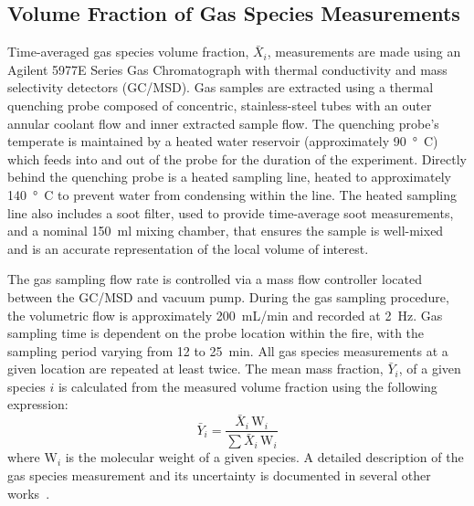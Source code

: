 \documentclass[12pt]{ussci}
\begin{document}
\subsection{Volume Fraction of Gas Species Measurements}
Time-averaged gas species volume fraction, $\bar{X}_{i}$, measurements are made using an Agilent 5977E Series Gas Chromatograph with thermal conductivity and mass selectivity detectors (GC/MSD). Gas samples are extracted using a thermal quenching probe composed of concentric, stainless-steel tubes with an outer annular coolant flow and inner extracted sample flow. The quenching probe's temperate is maintained by a heated water reservoir (approximately \SI{90}{\degree C}) which feeds into and out of the probe for the duration of the experiment. Directly behind the quenching probe is a heated sampling line, heated to approximately \SI{140}{\degree C} to prevent water from condensing within the line. The heated sampling line also includes a soot filter, used to provide time-average soot measurements, and a nominal 150~ml mixing chamber, that ensures the sample is well-mixed and is an accurate representation of the local volume of interest.

The gas sampling flow rate is controlled via a mass flow controller located between the GC/MSD and vacuum pump. During the gas sampling procedure, the volumetric flow is approximately 200~mL/min and recorded at 2~Hz. Gas sampling time is dependent on the probe location within the fire, with the sampling period varying from 12 to 25~min. All gas species measurements at a given location are repeated at least twice. The mean mass fraction, $\bar{Y}_{i}$, of a given species $i$ is calculated from the measured volume fraction using the following expression:
\begin{equation}\label{eq:mass_fraction}
	\bar{Y}_{i}=\frac{\bar{X}_{i} \, {\textrm{W}_{i}}}{\sum{\bar{X}_{i} \, {\textrm{W}_{i}}}}
\end{equation}
where ${{\textrm{W}_{i}}}$ is the molecular weight of a given species. A detailed description of the gas species measurement and its uncertainty is documented in several other works~\cite{Falkenstein2021a}. 
\end{document}
